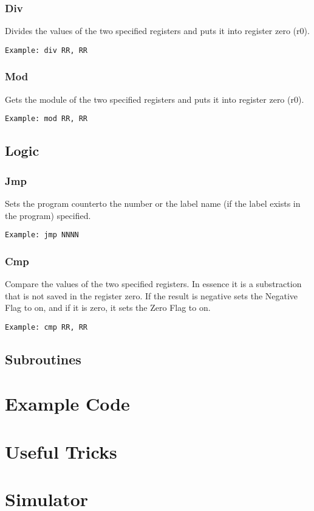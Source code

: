 \documentclass[oneside]{book}
\begin{document}
 \subsection{Div}
Divides the values of the two specified registers and puts it into register zero (r0).
\begin{Verbatim}
Example: div RR, RR
\end{Verbatim}

 \subsection{Mod}
Gets the module of the two specified registers and puts it into register zero (r0).
\begin{Verbatim}
Example: mod RR, RR
\end{Verbatim}

  \section{Logic}
 \subsection{Jmp}
Sets the program counterto the number or the label name (if the label exists in the program) specified.
\begin{Verbatim}
Example: jmp NNNN
\end{Verbatim}

 \subsection{Cmp}
Compare the values of the two specified registers. In essence it is a substraction that is not saved in the register zero. If the result is negative sets the Negative Flag to on, and if it is zero, it sets the Zero Flag to on.
\begin{Verbatim}
Example: cmp RR, RR
\end{Verbatim}

  \section{Subroutines}
\clearpage

\chapter{Example Code}
\clearpage

\chapter{Useful Tricks}
\clearpage

\chapter{Simulator}
\clearpage
\end{document}
